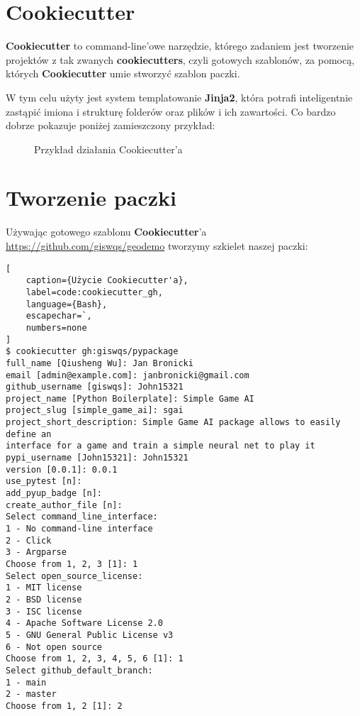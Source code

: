 \section{Cookiecutter}
\textbf{Cookiecutter} to command-line'owe narzędzie, którego zadaniem jest tworzenie projektów z tak zwanych \textbf{cookiecutters}, czyli gotowych szablonów, za pomocą, których \textbf{Cookiecutter} umie stworzyć szablon paczki.

W tym celu użyty jest system templatowanie \textbf{Jinja2}, która potrafi inteligentnie zastąpić imiona i strukturę folderów oraz plików i ich zawartości. Co bardzo dobrze pokazuje poniżej zamieszczony przykład:

\begin{figure}[h]
    \centering
    \caption{Przykład działania Cookiecutter'a \cite{CookiecutterExample}}
    \label{img:cookiecutter_example}
\end{figure}


\clearpage
\section{Tworzenie paczki}

Używając gotowego szablonu \textbf{Cookiecutter}'a 
\url{https://github.com/giswqs/geodemo} tworzymy szkielet naszej paczki:

\begin{onepage}
    \begin{lstlisting}[
    caption={Użycie Cookiecutter'a},
    label=code:cookiecutter_gh,
    language={Bash},
    escapechar=`,
    numbers=none
]
$ cookiecutter gh:giswqs/pypackage
full_name [Qiusheng Wu]: Jan Bronicki
email [admin@example.com]: janbronicki@gmail.com
github_username [giswqs]: John15321
project_name [Python Boilerplate]: Simple Game AI
project_slug [simple_game_ai]: sgai
project_short_description: Simple Game AI package allows to easily define an
interface for a game and train a simple neural net to play it
pypi_username [John15321]: John15321
version [0.0.1]: 0.0.1
use_pytest [n]:
add_pyup_badge [n]:
create_author_file [n]:
Select command_line_interface:
1 - No command-line interface
2 - Click
3 - Argparse
Choose from 1, 2, 3 [1]: 1
Select open_source_license:
1 - MIT license
2 - BSD license
3 - ISC license
4 - Apache Software License 2.0
5 - GNU General Public License v3
6 - Not open source
Choose from 1, 2, 3, 4, 5, 6 [1]: 1
Select github_default_branch:
1 - main
2 - master
Choose from 1, 2 [1]: 2
\end{lstlisting}
\end{onepage}

